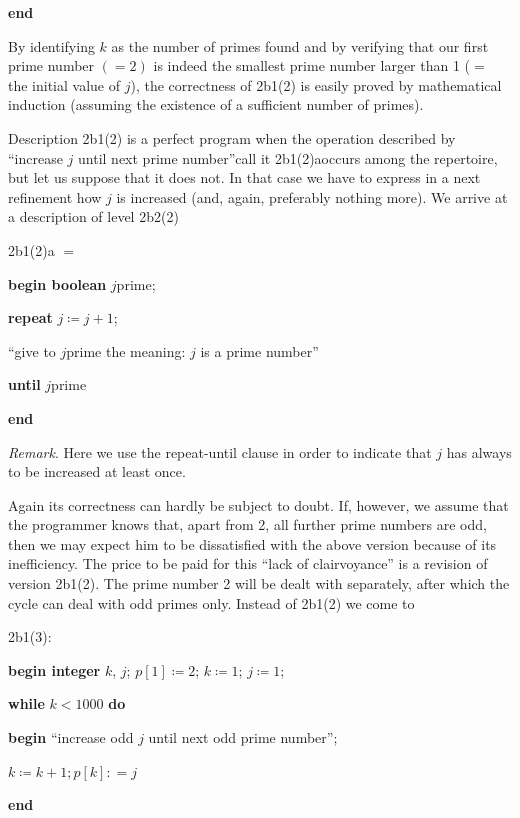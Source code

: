 \noindent
\textbf{end}

By identifying $k$ as the number of primes found and by verifying that our first prime number $(=2)$ is indeed the smallest prime number larger than 1 ($=$ the initial value of $j$), the correctness of 2b1(2) is easily proved by mathematical induction (assuming the existence of a sufficient number of primes).

Description 2b1(2) is a perfect program when the operation described by ``increase $j$ until next prime number''\textemdash{}call it 2b1(2)a\textemdash{}occurs among the repertoire, but let us suppose that it does not. In that case we have to express in a next refinement how $j$ is increased (and, again, preferably nothing more). We arrive at a description of level 2b2(2)

\noindent
2b1(2)a $=$

\noindent
\textbf{begin boolean} $j$prime;

\noindent
\quad \textbf{repeat} $j \coloneq j + 1$;

\noindent
\quad\quad  ``give to $j$prime the meaning: $j$ is a prime number''

\noindent
\quad \textbf{until} $j$prime

\noindent
\textbf{end}

\noindent
\textit{Remark}. Here we use the repeat-until clause in order to indicate that $j$ has always to be increased at least once.

Again its correctness can hardly be subject to doubt. If, however, we assume that the programmer knows that, apart from 2, all further prime numbers are odd, then we may expect him to be dissatisfied with the above version because of its inefficiency. The price to be paid for this ``lack of clairvoyance'' is a revision of version 2b1(2). The prime number 2 will be dealt with separately, after which the cycle can deal with odd primes only. Instead of 2b1(2) we come to

\noindent
2b1(3):

\noindent
\textbf{begin integer} $k$, $j$; $p[1] \coloneq 2$; $k \coloneq 1$; $j \coloneq 1$;

\noindent
\quad\textbf{while} $k < 1000$ \textbf{do}

\noindent
\quad\quad\textbf{begin} ``increase odd $j$ until next odd prime number'';

\noindent
\quad\quad\quad $k \coloneq k + 1; p[k]: = j$

\noindent
\quad\quad\textbf{end}

